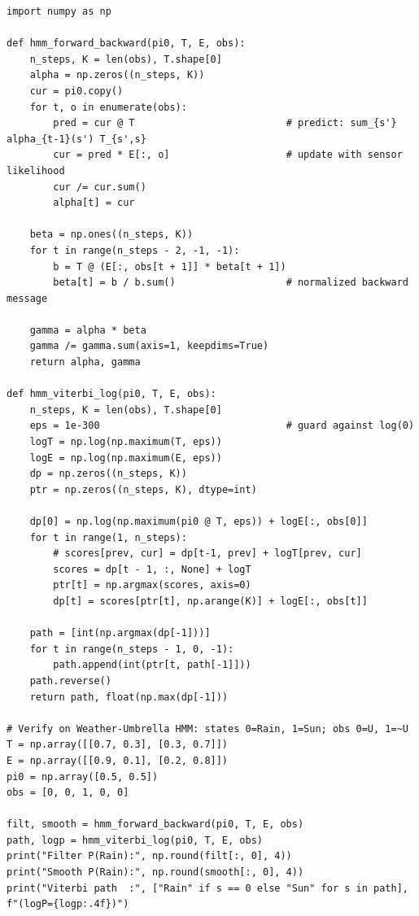 \begin{lstlisting}[caption={HMM 前向滤波、前向-后向平滑与对数空间 Viterbi 完整实现},label={lst:hmm}]
import numpy as np

def hmm_forward_backward(pi0, T, E, obs):
    n_steps, K = len(obs), T.shape[0]
    alpha = np.zeros((n_steps, K))
    cur = pi0.copy()
    for t, o in enumerate(obs):
        pred = cur @ T                          # predict: sum_{s'} alpha_{t-1}(s') T_{s',s}
        cur = pred * E[:, o]                    # update with sensor likelihood
        cur /= cur.sum()
        alpha[t] = cur

    beta = np.ones((n_steps, K))
    for t in range(n_steps - 2, -1, -1):
        b = T @ (E[:, obs[t + 1]] * beta[t + 1])
        beta[t] = b / b.sum()                   # normalized backward message

    gamma = alpha * beta
    gamma /= gamma.sum(axis=1, keepdims=True)
    return alpha, gamma

def hmm_viterbi_log(pi0, T, E, obs):
    n_steps, K = len(obs), T.shape[0]
    eps = 1e-300                                # guard against log(0)
    logT = np.log(np.maximum(T, eps))
    logE = np.log(np.maximum(E, eps))
    dp = np.zeros((n_steps, K))
    ptr = np.zeros((n_steps, K), dtype=int)

    dp[0] = np.log(np.maximum(pi0 @ T, eps)) + logE[:, obs[0]]
    for t in range(1, n_steps):
        # scores[prev, cur] = dp[t-1, prev] + logT[prev, cur]
        scores = dp[t - 1, :, None] + logT
        ptr[t] = np.argmax(scores, axis=0)
        dp[t] = scores[ptr[t], np.arange(K)] + logE[:, obs[t]]

    path = [int(np.argmax(dp[-1]))]
    for t in range(n_steps - 1, 0, -1):
        path.append(int(ptr[t, path[-1]]))
    path.reverse()
    return path, float(np.max(dp[-1]))

# Verify on Weather-Umbrella HMM: states 0=Rain, 1=Sun; obs 0=U, 1=~U
T = np.array([[0.7, 0.3], [0.3, 0.7]])
E = np.array([[0.9, 0.1], [0.2, 0.8]])
pi0 = np.array([0.5, 0.5])
obs = [0, 0, 1, 0, 0]

filt, smooth = hmm_forward_backward(pi0, T, E, obs)
path, logp = hmm_viterbi_log(pi0, T, E, obs)
print("Filter P(Rain):", np.round(filt[:, 0], 4))
print("Smooth P(Rain):", np.round(smooth[:, 0], 4))
print("Viterbi path  :", ["Rain" if s == 0 else "Sun" for s in path], f"(logP={logp:.4f})")
\end{lstlisting}

